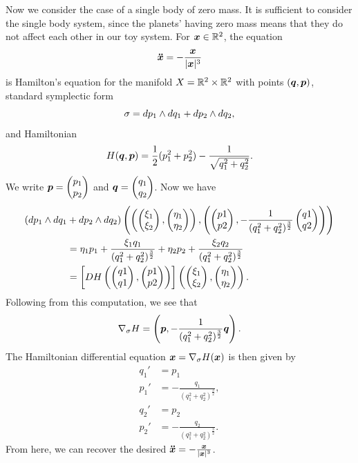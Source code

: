 \documentclass[twoside,letterpaper,11pt]{article}
\newcommand{\sgrad}{\nabla_{\sigma}}
\numberwithin{equation}{section}
\begin{document}
Now we consider the case of a single body of zero mass.
It is sufficient to consider the single body system, since the planets' having
zero mass means that they do not affect each other in our toy system.
For $\bm{x} \in \mathbb{R}^2$, the equation
\begin{equation*}
  \bm{\ddot{x}} = - \frac{\bm{x}}{|\bm{x}|^3}
\end{equation*}
is Hamilton's equation for the manifold $X = \mathbb{R}^2 \times \mathbb{R}^2$ with points
$(\bm{q}, \bm{p})$, standard symplectic form
\begin{equation*}
  \sigma = \mathop{}\!d p_1 \wedge \mathop{}\!d q_1 + \mathop{}\!d p_2 \wedge \mathop{}\!d q_2,
\end{equation*}
and Hamiltonian
\begin{equation*}
  H(\bm{q}, \bm{p}) = \frac{1}{2} (p_1^2 + p_2^2) - \frac{1}{\sqrt{q_1^2 +
      q_2^2}}.
\end{equation*}
We write $\bp{p} = \pt{p_1\\ p_2}$ and $\bp{q} = \pt{q_1\\q_2}$.
Now we have
\begin{align*}
  (\dif p_1 \wedge \dif q_1 &+ \dif p_2 \wedge \dif q_2)
                              \left(\left(\pt{\xi_1\\\xi_2}, \pt{\eta_1\\\eta_2}
  \right), \left( \pt{p1\\p2}, - \frac{1}{(q_1^2 + q_2^2)^{\frac{3}{2}}}
  \pt{q1\\q2} \right)\right)\\
                            &= \eta_1 p_1 + \frac{\xi_1 q_1}{(q_1^2 +
                              q_2^2)^{\frac{3}{2}}} + \eta_2 p_2 + \frac{\xi_2
                              q_2}{(q_1^2 + q_2^2)^{\frac{3}{2}}}\\
                            &= \left[ \Dif H \left( \pt{q1\\q1}, \pt{p1\\p2}
  \right) \right] \left( \pt{\xi_1\\\xi_2}, \pt{\eta_1\\\eta_2} \right).
\end{align*}
Following from this computation, we see that
\begin{equation*}
  \sgrad H = \left(\bp{p}, - \frac{1}{(q_1^2 + q_2^2)^{\frac{3}{2}}}\bp{q}
  \right).
\end{equation*}
The Hamiltonian differential equation $\bp{x} = \sgrad H(\bp{x})$ is then given
by
\begin{align*}
  q_1' &= p_1\\
  p_1' &= - \frac{q_1}{(q_1^2 + q_2^2)^{\frac{3}{2}}},\\
  q_2' &= p_2\\
  p_2' &= -\frac{q_2}{(q_1^2 + q_2^2)^{\frac{3}{2}}}.
\end{align*}
From here, we can recover the desired $\bm{\ddot{x}} = - \frac{\bm{x}}{|\bm{x}|^3}$.
\end{document}
